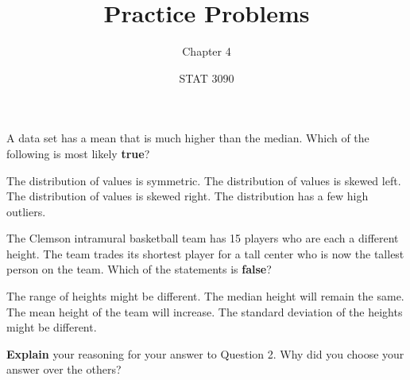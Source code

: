 \documentclass[noanswers]{exam}
\title{Practice Problems}
\author{Chapter 4}
\date{STAT 3090}
\begin{document}
%
%

\begin{questions} 
	
	\question A data set has a mean that is much higher than the median. Which of the following is most likely \textbf{true}?
	
	\vspace{2mm}
	
	\begin{choices}
	
		\choice The distribution of values is symmetric.
		\choice The distribution of values is skewed left.
		\CorrectChoice The distribution of values is skewed right.
		\choice The distribution has a few high outliers.	
	
	\end{choices}
	
	\vspace{3mm}
	
	\question The Clemson intramural basketball team has 15 players who are each a different height. The team trades its shortest player for a tall center who is now the tallest person on the team. Which of the statements is \textbf{false}?
	
	\vspace{2mm}
	
	\begin{choices}
	
		\choice The range of heights might be different.
		\CorrectChoice The median height will remain the same.
		\choice The mean height of the team will increase.
		\choice The standard deviation of the heights might be different.	
	
	\end{choices}
	
	\vspace{3mm}
	
	\question \textbf{Explain} your reasoning for your answer to Question 2. Why did you choose your answer over the others?
	
	\begin{solution}[\stretch{1}]
	
			\vspace{3mm}		
		

\end{solution}
\end{questions}
\end{document}
